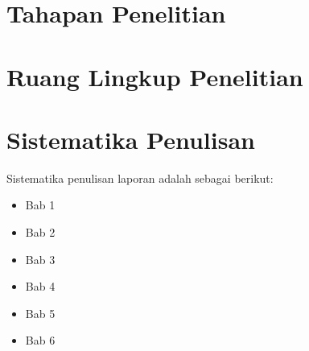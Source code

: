 \paragraph{}

\section{Tahapan Penelitian}
\section{Ruang Lingkup Penelitian}

\section{Sistematika Penulisan}
Sistematika penulisan laporan adalah sebagai berikut:
\begin{itemize}
	\item Bab 1 \babSatu \\
	\item Bab 2 \babDua \\
	\item Bab 3 \babTiga \\
	\item Bab 4 \babEmpat \\
	\item Bab 5 \babLima \\
	\item Bab 6 \babEnam \\
\end{itemize}

